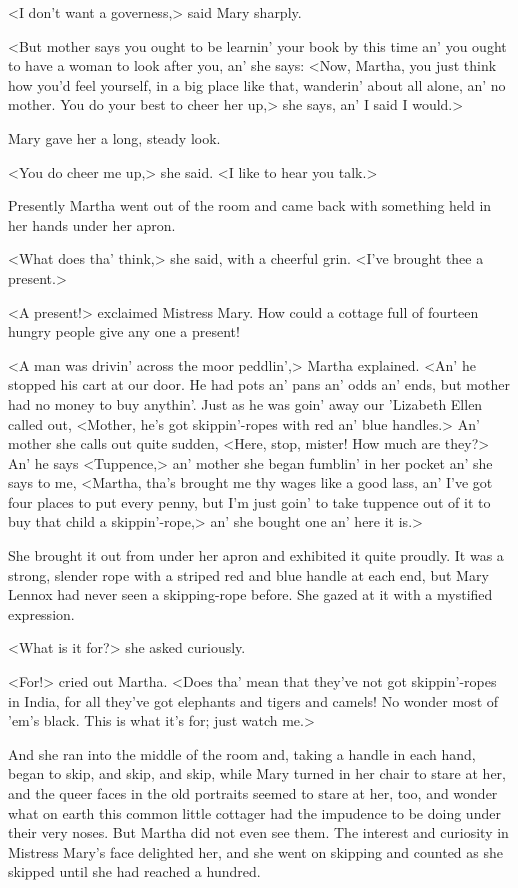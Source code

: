 <I don't want a governess,> said Mary sharply.

<But mother says you ought to be learnin' your book by this time an' you ought to have a woman to look after you, an' she says: <Now, Martha, you just think how you'd feel yourself, in a big place like that, wanderin' about all alone, an' no mother. You do your best to cheer her up,> she says, an' I said I would.>

Mary gave her a long, steady look.

<You do cheer me up,> she said. <I like to hear you talk.>

Presently Martha went out of the room and came back with something held in her hands under her apron.

<What does tha' think,> she said, with a cheerful grin. <I've brought thee a present.>

<A present!> exclaimed Mistress Mary. How could a cottage full of fourteen hungry people give any one a present!

<A man was drivin' across the moor peddlin',> Martha explained. <An' he stopped his cart at our door. He had pots an' pans an' odds an' ends, but mother had no money to buy anythin'. Just as he was goin' away our 'Lizabeth Ellen called out, <Mother, he's got skippin'-ropes with red an' blue handles.> An' mother she calls out quite sudden, <Here, stop, mister! How much are they?> An' he says <Tuppence,> an' mother she began fumblin' in her pocket an' she says to me, <Martha, tha's brought me thy wages like a good lass, an' I've got four places to put every penny, but I'm just goin' to take tuppence out of it to buy that child a skippin'-rope,> an' she bought one an' here it is.>

She brought it out from under her apron and exhibited it quite proudly. It was a strong, slender rope with a striped red and blue handle at each end, but Mary Lennox had never seen a skipping-rope before. She gazed at it with a mystified expression.

<What is it for?> she asked curiously.

<For!> cried out Martha. <Does tha' mean that they've not got skippin'-ropes in India, for all they've got elephants and tigers and camels! No wonder most of 'em's black. This is what it's for; just watch me.>

And she ran into the middle of the room and, taking a handle in each hand, began to skip, and skip, and skip, while Mary turned in her chair to stare at her, and the queer faces in the old portraits seemed to stare at her, too, and wonder what on earth this common little cottager had the impudence to be doing under their very noses. But Martha did not even see them. The interest and curiosity in Mistress Mary's face delighted her, and she went on skipping and counted as she skipped until she had reached a hundred.


